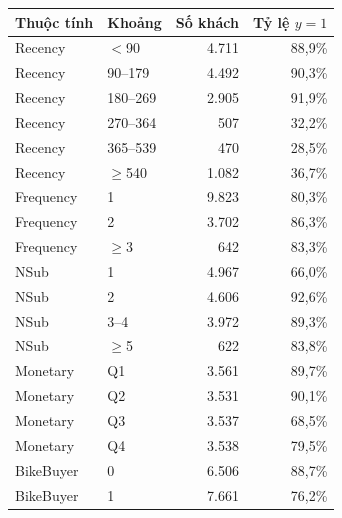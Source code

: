 \begin{tabular}{llrr}
\toprule
Thuộc tính & Khoảng & Số khách & Tỷ lệ $y=1$ \\
\midrule
Recency & $<$90 & 4.711 & 88,9\% \\
Recency & 90–179 & 4.492 & 90,3\% \\
Recency & 180–269 & 2.905 & 91,9\% \\
Recency & 270–364 & 507 & 32,2\% \\
Recency & 365–539 & 470 & 28,5\% \\
Recency & $\geq$540 & 1.082 & 36,7\% \\
Frequency & 1 & 9.823 & 80,3\% \\
Frequency & 2 & 3.702 & 86,3\% \\
Frequency & $\geq$3 & 642 & 83,3\% \\
NSub & 1 & 4.967 & 66,0\% \\
NSub & 2 & 4.606 & 92,6\% \\
NSub & 3–4 & 3.972 & 89,3\% \\
NSub & $\geq$5 & 622 & 83,8\% \\
Monetary & Q1 & 3.561 & 89,7\% \\
Monetary & Q2 & 3.531 & 90,1\% \\
Monetary & Q3 & 3.537 & 68,5\% \\
Monetary & Q4 & 3.538 & 79,5\% \\
BikeBuyer & 0 & 6.506 & 88,7\% \\
BikeBuyer & 1 & 7.661 & 76,2\% \\
\bottomrule
\end{tabular}
